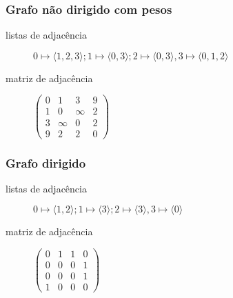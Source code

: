 \documentclass{beamer}
\begin{document}
\begin{frame}
\frametitle{Grafo não dirigido com pesos}

\begin{center}
\end{center}

\begin{description}

\item[listas de adjacência] $0 \mapsto \langle 1, 2, 3 \rangle; 1 \mapsto \langle 0, 3 \rangle;
2 \mapsto \langle 0, 3 \rangle, 3 \mapsto \langle 0, 1, 2\rangle$

\item[matriz de adjacência] $\left( 
\begin{array}{cccc}
0 & 1 & 3 & 9 \\
1 & 0 & \infty & 2 \\
3 & \infty & 0 & 2 \\
9 & 2 & 2 & 0
\end{array}
\right)
$
\end{description}
\end{frame}

\begin{frame}
\frametitle{Grafo dirigido}

\begin{center}
\end{center}

\begin{description}

\item[listas de adjacência] $0 \mapsto \langle 1, 2 \rangle; 1 \mapsto \langle 3 \rangle;
2 \mapsto \langle 3 \rangle, 3 \mapsto \langle 0\rangle$

\item[matriz de adjacência] $\left( 
\begin{array}{cccc}
0 & 1 & 1 & 0 \\
0 & 0 & 0 & 1 \\
0 & 0 & 0 & 1 \\
1 & 0 & 0 & 0
\end{array}
\right)
$
\end{description}
\end{frame}
\end{document}
